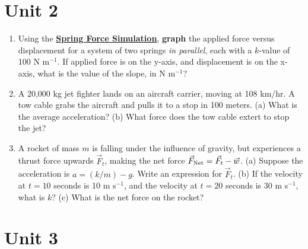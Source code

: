 \documentclass{article}
\begin{document}
\section{Unit 2}

\begin{enumerate}
\item Using the \textbf{\href{https://phet.colorado.edu/en/simulations/hookes-law}{Spring Force Simulation}}, \textbf{graph} the applied force versus displacement for a system of two springs \textit{in parallel}, each with a $k$-value of 100 N m$^{-1}$.  If applied force is on the y-axis, and displacement is on the x-axis, what is the value of the slope, in N m$^{-1}$? \\ \vspace{3cm}

\item A 20,000 kg jet fighter lands on an aircraft carrier, moving at 108 km/hr. A tow cable grabs the aircraft and pulls it to a stop in 100 meters. (a) What is the average acceleration? (b) What force does the tow cable extert to stop the jet? \\ \vspace{3cm}

\item A rocket of mass $m$ is falling under the influence of gravity, but experiences a thrust force upwards $\vec{F}_t$, making the net force $\vec{F}_{\rm Net} = \vec{F}_t-\vec{w}$.  (a) Suppose the acceleration is $a = (k/m) - g$.  Write an expression for $\vec{F}_t$. (b) If the velocity at $t=10$ seconds is 10 m s$^{-1}$, and the velocity at $t=20$ seconds is 30 m s$^{-1}$, what is $k$? (c) What is the net force on the rocket? \\ \vspace{4cm}

\end{enumerate}

\section{Unit 3}
\end{document}
